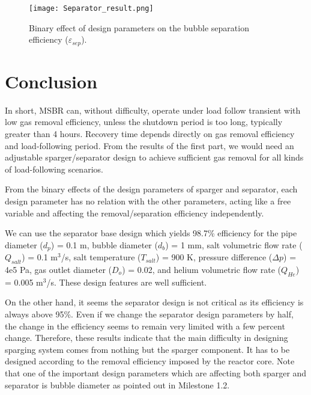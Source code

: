 \begin{figure}[htbp!]
    \begin{center}
        \texttt{[image: Separator\_result.png]}
    \end{center}
    \caption{Binary effect of design parameters on the bubble separation
    efficiency ($\varepsilon$$_{sep}$).}
    \label{fig:binary_eff_separator}
\end{figure}

\FloatBarrier

\section{Conclusion}

    In short, \gls{MSBR} can, without difficulty, operate under load follow transient 
    with low gas removal efficiency, unless the shutdown period is too long, 
    typically greater than 4 hours. Recovery time depends directly on gas 
    removal efficiency and load-following period. From the results of the first 
    part, we would need an adjustable sparger/separator design to achieve 
    sufficient gas removal for all kinds of load-following scenarios.

    From the binary effects of the design parameters of sparger and separator, 
    each design parameter has no relation with the other parameters, acting 
    like a free variable and affecting the removal/separation efficiency 
    independently.

    We can use the separator base design which yields 98.7\% efficiency for the 
    pipe diameter ($d_p$) = 0.1 m, bubble diameter ($d_b$) = 1 mm, salt 
    volumetric flow rate ($Q_{salt}$) = 0.1 m$^{3}$/s, salt temperature 
    ($T_{salt}$) = 900 K, pressure difference ($\Delta p$) = 4e5 Pa, gas outlet 
    diameter ($D_o$) = 0.02, and helium volumetric flow rate ($Q_{He}$) = 0.005 
    m$^{3}$/s. These design features are well sufficient.

    On the other hand, it seems the separator design is not critical as its 
    efficiency is always above 95\%. Even if we change the separator design 
    parameters by half, the change in the efficiency seems to remain very 
    limited with a few percent change. Therefore, these results indicate that 
    the main difficulty in designing sparging system comes from nothing but the 
    sparger component. It has to be designed according to the removal 
    efficiency imposed by the reactor core. Note that one of the important 
    design parameters which are affecting both sparger and separator is bubble 
    diameter as pointed out in Milestone 1.2.

